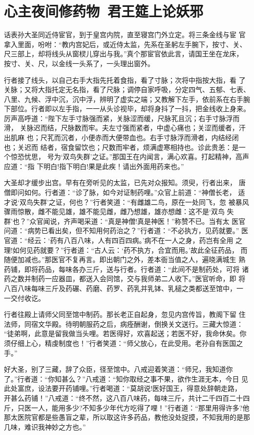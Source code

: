 \chapter{心主夜间修药物~君王筵上论妖邪}

话表孙大圣同近侍宦官，到于皇宫内院，直至寝宫门外立定。将三条金线与宦
官拿入里面，吩咐：“教内宫妃后，或近侍太监，先系在圣躬左手腕下，按寸、关、
尺三部上，却将线头从窗棂儿穿出与我。”真个那宦官依此言，请国王坐在龙床，
按寸、关、尺，以金线一头系了，一头理出窗外。

行者接了线头，以自己右手大指先托着食指，看了寸脉；次将中指按大指，看
了关脉；又将大指托定无名指，看了尺脉；调停自家呼吸，分定四气、五郁、七表、
八里、九候、浮中沉，沉中浮，辨明了虚实之端；又教解下左手，依前系在右手腕
下部位。行者即以左手指，一一从头诊视毕，却将身抖了一抖，把金线收上身来。
厉声高呼道：“陛下左手寸脉强而紧，关脉涩而缓，尺脉芤且沉；右手寸脉浮而滑，
关脉迟而结，尺脉数而牢。夫左寸强而紧者，中虚心痛也；关涩而缓者，汗出肌麻
也；尺芤而沉者，小便赤而大便带血也。右手寸脉浮而滑者，内结经闭也；关迟而
结者，宿食留饮也；尺数而牢者，烦满虚寒相持也。诊此贵恙：是一个惊恐忧思，
号为‘双鸟失群’之证。”那国王在内闻言，满心欢喜。打起精神，高声应道：“指
下明白!指下明白!果是此疾！请出外面用药来也。”

大圣却才缓步出宫。早有在旁听见的太监，已先对众报知。须臾，行者出来，
唐僧即问如何。行者道：“诊了脉，如今对证制药哩。”众官上前道：“神僧长老，
适才说‘双鸟失群’之证，何也？”行者笑道：“有雌雄二鸟，原在一处同飞，忽
被暴风骤雨惊散，雌不能见雄，雄不能见雌，雌乃想雄，雄亦想雌：这不是‘双鸟
失群’也？”众官闻说，齐声喝采道：“真是神僧!真是神医！”称赞不已。当有太
医官问道：“病势已看出矣，但不知用何药治之？”行者道：“不必执方，见药就要。”
医官道：“经云：‘药有八百八味，人有四百四病。’病不在一人之身，药岂有全用
之理!如何见药就要？”行者道：“古人云：‘药不执方，合宜而用。’故此全征药品，
而随便加减也。”那医官不复再言。即出朝门之外，差本衙当值之人，遍晓满城生
熟药铺，即将药品，每味各办三斤，送与行者。行者道：“此间不是制药处，可将
诸药之数并制药一应器皿，都送入会同馆，交与我师弟二人收下。”医官听命，即
将八百八味每味三斤及药碾、药磨、药罗、药乳并乳钵、乳槌之类都送至馆中，一
一交付收讫。

行者往殿上请师父同至馆中制药。那长老正自起身，忽见内宫传旨，教阁下留
住法师，同宿文华殿。待明朝服药之后，病痊酬谢，倒换关文送行。三藏大惊道：
“徒弟啊，此意是留我做当头哩。若医得好，欢喜起送；若医不好，我命休矣。你
须仔细上心，精虔制度也！”行者笑道：“师父放心，在此受用。老孙自有医国之手。”

好大圣，别了三藏，辞了众臣，径至馆中。八戒迎着笑道：“师兄，我知道你
了。”行者道：“你知甚么？”八戒道：“知你取经之事不果，欲作生涯无本，今日
见此处富庶，设法要开药铺哩。”行者喝道：“莫胡说!医好国王，得意处辞朝走路，
开甚么药铺！”八戒道：“终不然，这八百八味药，每味三斤，共计二千四百二十四
斤，只医一人，能用多少?不知多少年代方吃得了哩！”行者道：“那里用得许多?他
那太医院官都是些愚盲之辈，所以取这许多药品，教他没处捉摸，不知我用的是那
几味，难识我神妙之方也。”

